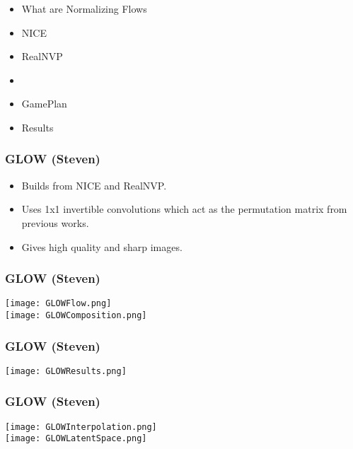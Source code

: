 \begin{frame}
\begin{itemize}
    \item What are Normalizing Flows
    \item NICE
    \item RealNVP
    \item \textbf{\color{red}{GLOW}}
    \item GamePlan
    \item Results
\end{itemize}
\end{frame}

\begin{frame}
    \frametitle{GLOW (Steven)}
    \begin{itemize}
        \item Builds from NICE and RealNVP.
        \item Uses 1x1 invertible convolutions which act as the permutation
            matrix from previous works.
        \item Gives high quality and sharp images.
    \end{itemize}
\end{frame}

\begin{frame}
    \frametitle{GLOW (Steven)}
    \center\texttt{[image: GLOWFlow.png]}\\
    \center\texttt{[image: GLOWComposition.png]}
\end{frame}

\begin{frame}
    \frametitle{GLOW (Steven)}
    \center\texttt{[image: GLOWResults.png]}
\end{frame}

\begin{frame}
    \frametitle{GLOW (Steven)}
    \center\texttt{[image: GLOWInterpolation.png]}\\
    \center\texttt{[image: GLOWLatentSpace.png]}\\
\end{frame}

